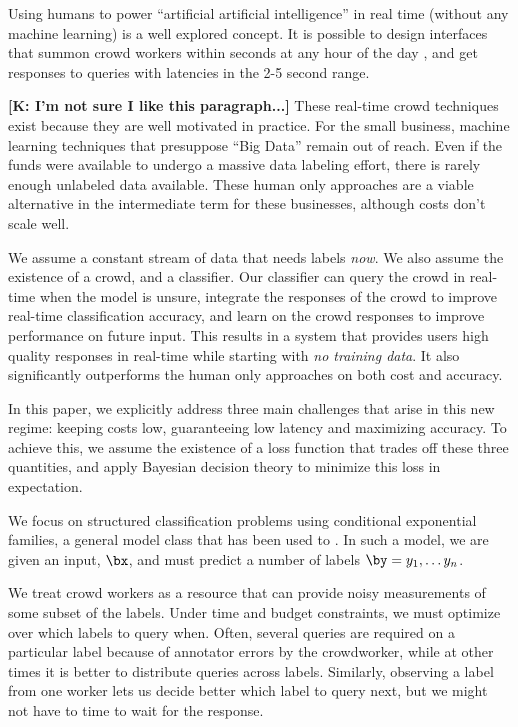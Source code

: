 Using humans to power ``artificial artificial intelligence'' in real time (without any machine learning) is a well explored concept. It is possible to design interfaces that summon crowd workers within seconds at any hour of the day , and get responses to queries with latencies in the 2-5 second range.

\textbf{[K: I'm not sure I like this paragraph...]} These real-time crowd techniques exist because they are well motivated in practice.
For the small business, machine learning techniques that presuppose ``Big Data'' remain out of reach.
Even if the funds were available to undergo a massive data labeling effort, there is rarely enough unlabeled data available.
These human only approaches are a viable alternative in the intermediate term for these businesses, although costs don't scale well.

We assume a constant stream of data that needs labels {\em now}.
We also assume the existence of a crowd, and a classifier.
Our classifier can query the crowd in real-time when the model is unsure, integrate the responses of the crowd to improve real-time classification accuracy, and learn on the crowd responses to improve performance on future input.
This results in a system that provides users high quality responses in real-time while starting with {\em no training data}.
It also significantly outperforms the human only approaches on both cost and accuracy.

In this paper, we explicitly address three main challenges that arise in this new regime: keeping costs low, guaranteeing low latency and maximizing accuracy. To achieve this, we assume the existence of a loss function that trades off these three quantities, and apply Bayesian decision theory to minimize this loss in expectation.

We focus on structured classification problems using conditional exponential families, a general model class that has been used to . In such a model, we are given an input, $\bx$, and must predict a number of labels $\by = y_1, \ldots y_n$.

We treat crowd workers as a resource that can provide noisy measurements of some subset of the labels.
Under time and budget constraints, we must optimize over which labels to query when. 
Often, several queries are required on a particular label because of annotator errors by the crowdworker, while at other times it is better to distribute queries across labels.
Similarly, observing a label from one worker lets us decide better which label to query next, but we might not have to time to wait for the response.

